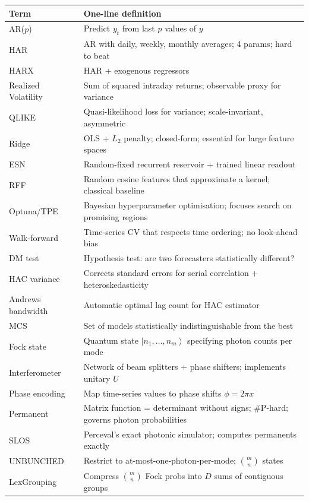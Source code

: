 \documentclass[11pt]{article}
\providecommand{\ket}[1]{\left| #1 \right\rangle}
\begin{document}
\begin{center}
\begin{tabular}{p{3cm} p{11cm}}
\toprule
\textbf{Term} & \textbf{One-line definition} \\
\midrule
AR($p$) & Predict $y_t$ from last $p$ values of $y$ \\
HAR & AR with daily, weekly, monthly averages; 4 params; hard to beat \\
HARX & HAR + exogenous regressors \\
Realized Volatility & Sum of squared intraday returns; observable proxy for variance \\
QLIKE & Quasi-likelihood loss for variance; scale-invariant, asymmetric \\
Ridge & OLS + $L_2$ penalty; closed-form; essential for large feature spaces \\
ESN & Random-fixed recurrent reservoir + trained linear readout \\
RFF & Random cosine features that approximate a kernel; classical baseline \\
Optuna/TPE & Bayesian hyperparameter optimisation; focuses search on promising regions \\
Walk-forward & Time-series CV that respects time ordering; no look-ahead bias \\
DM test & Hypothesis test: are two forecasters statistically different? \\
HAC variance & Corrects standard errors for serial correlation + heteroskedasticity \\
Andrews bandwidth & Automatic optimal lag count for HAC estimator \\
MCS & Set of models statistically indistinguishable from the best \\
Fock state & Quantum state $\ket{n_1,\ldots,n_m}$ specifying photon counts per mode \\
Interferometer & Network of beam splitters + phase shifters; implements unitary $U$ \\
Phase encoding & Map time-series values to phase shifts $\phi = 2\pi x$ \\
Permanent & Matrix function = determinant without signs; \#P-hard; governs photon probabilities \\
SLOS & Perceval's exact photonic simulator; computes permanents exactly \\
UNBUNCHED & Restrict to at-most-one-photon-per-mode; $\binom{m}{n}$ states \\
LexGrouping & Compress $\binom{m}{n}$ Fock probs into $D$ sums of contiguous groups \\

\end{tabular}
\end{center}
\end{document}
